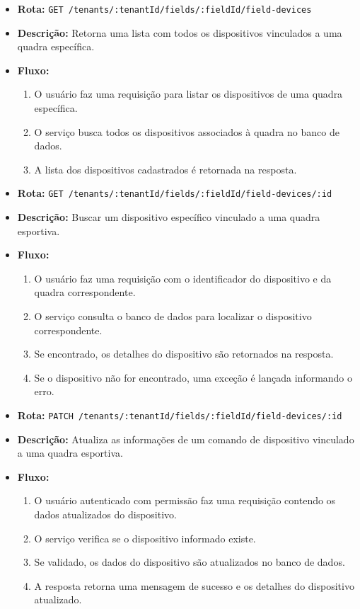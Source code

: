 \begin{itemize}
\item \textbf{Rota:} \texttt{GET /tenants/:tenantId/fields/:fieldId/field-devices}
\item \textbf{Descrição:} Retorna uma lista com todos os dispositivos vinculados a uma quadra específica.
\item \textbf{Fluxo:}
\begin{enumerate}
\item O usuário faz uma requisição para listar os dispositivos de uma quadra específica.
\item O serviço busca todos os dispositivos associados à quadra no banco de dados.
\item A lista dos dispositivos cadastrados é retornada na resposta.
\end{enumerate}
\end{itemize}

\begin{itemize}
\item \textbf{Rota:} \texttt{GET /tenants/:tenantId/fields/:fieldId/field-devices/:id}
\item \textbf{Descrição:} Buscar um dispositivo específico vinculado a uma quadra esportiva.
\item \textbf{Fluxo:}
\begin{enumerate}
\item O usuário faz uma requisição com o identificador do dispositivo e da quadra correspondente.
\item O serviço consulta o banco de dados para localizar o dispositivo correspondente.
\item Se encontrado, os detalhes do dispositivo são retornados na resposta.
\item Se o dispositivo não for encontrado, uma exceção é lançada informando o erro.
\end{enumerate}
\end{itemize}

\begin{itemize}
\item \textbf{Rota:} \texttt{PATCH /tenants/:tenantId/fields/:fieldId/field-devices/:id}
\item \textbf{Descrição:} Atualiza as informações de um comando de dispositivo vinculado a uma quadra esportiva.
\item \textbf{Fluxo:}
\begin{enumerate}
\item O usuário autenticado com permissão faz uma requisição contendo os dados atualizados do dispositivo.
\item O serviço verifica se o dispositivo informado existe.
\item Se validado, os dados do dispositivo são atualizados no banco de dados.
\item A resposta retorna uma mensagem de sucesso e os detalhes do dispositivo atualizado.
\end{enumerate}
\end{itemize}

